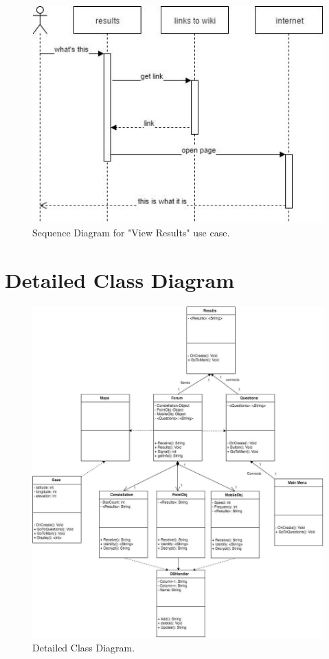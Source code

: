 \documentclass[]{article}
\begin{document}
\begin{figure}[!h]
    \caption{Sequence Diagram for "View Results" use case.}
    \centering
    \includegraphics[scale=0.5]{viewresults.jpg}
\end{figure}


\section{Detailed Class Diagram}
\label{sec:detailed_class_diagram}

\begin{figure}[!h]
    \caption{Detailed Class Diagram.}
    \centering
    \includegraphics[scale=0.5]{detailedclass.jpg}
\end{figure}
\end{document}

